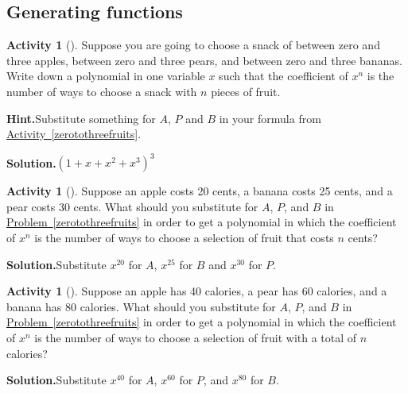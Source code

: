 \documentclass[10pt,]{book}
\theoremstyle{plain}
\theoremstyle{definition}
\newtheorem{activity}[project]{Activity}
\numberwithin{equation}{chapter}
\begin{document}
\subsection[{Generating functions}]{Generating functions}\label{subsection-41}
\begin{activity}[]\label{activity-156}
Suppose you are going to choose a snack of between zero and three apples, between zero and three pears, and between zero and three bananas. Write down a polynomial in one variable \(x\) such that the coefficient of \(x^n\) is the number of ways to choose a snack with \(n\) pieces of fruit.%
\par\medskip\noindent%
\textbf{Hint.}\quad Substitute something for \(A\), \(P\) and \(B\) in your formula from \hyperref[zerotothreefruits]{Activity~\ref{zerotothreefruits}}.%
\par\medskip\noindent%
\textbf{Solution.}\quad \((1+x+x^2+x^3)^3\)%
\end{activity}
\begin{activity}[]\label{activity-157}
Suppose an apple costs 20 cents, a banana costs 25 cents, and a pear costs 30 cents. What should you substitute for \(A\), \(P\), and \(B\) in \hyperref[zerotothreefruits]{Problem~\ref{zerotothreefruits}} in order to get a polynomial in which the coefficient of \(x^n\) is the number of ways to choose a selection of fruit that costs \(n\) cents?%
\par\medskip\noindent%
\textbf{Solution.}\quad Substitute \(x^{20}\) for \(A\), \(x^{25}\) for \(B\) and \(x^{30}\) for \(P\).%
\end{activity}
\begin{activity}[]\label{activity-158}
Suppose an apple has 40 calories, a pear has 60 calories, and a banana has 80 calories. What should you substitute for \(A\), \(P\), and \(B\) in \hyperref[zerotothreefruits]{Problem~\ref{zerotothreefruits}} in order to get a polynomial in which the coefficient of \(x^n\) is the number of ways to choose a selection of fruit with a total of \(n\) calories?%
\par\medskip\noindent%
\textbf{Solution.}\quad Substitute \(x^{40}\) for \(A\), \(x^{60}\) for \(P\), and \(x^{80}\) for \(B\).%
\end{activity}
\end{document}
